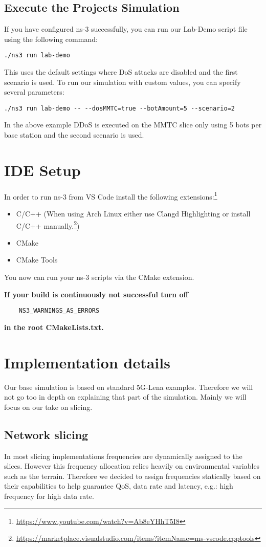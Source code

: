 \subsection{Execute the Projects Simulation}
If you have configured ns-3 successfully, you can run our Lab-Demo script file using the following command:
\begin{verbatim}
./ns3 run lab-demo
\end{verbatim}
This uses the default settings where DoS attacks are disabled and the first scenario is used. To run our simulation with custom values, you can specify several parameters:
\begin{verbatim}
./ns3 run lab-demo -- --dosMMTC=true --botAmount=5 --scenario=2
\end{verbatim}
In the above example DDoS is executed on the MMTC slice only using 5 bots per base station and the second scenario is used.

\section{IDE Setup}

In order to run ns-3 from VS Code install the following extensions:\footnote[3]{\url{https://www.youtube.com/watch?v=Ab8eYHhT5I8}}
\begin{itemize}
    \item C/C++ (When using Arch Linux either use Clangd Highlighting or install C/C++ manually.\footnote[4]{\url{https://marketplace.visualstudio.com/items?itemName=ms-vscode.cpptools}})
    \item CMake
    \item CMake Tools
\end{itemize}
You now can run your ns-3 scripts via the CMake extension.

\textbf{If your build is continuously not successful turn off} \begin{verbatim}
    NS3_WARNINGS_AS_ERRORS
\end{verbatim} \textbf{in the root CMakeLists.txt.}

\section{Implementation details}
    Our base simulation is based on standard 5G-Lena examples. Therefore we will not go too in depth on explaining that part of the simulation.
    Mainly we will focus on our take on slicing.
    
    \subsection{Network slicing}
    In most slicing implementations frequencies are dynamically assigned to the slices. However this frequency allocation relies heavily on environmental variables such as the terrain. Therefore we decided to assign frequencies statically based on their capabilities to help guarantee QoS, data rate and latency, e.g.: high frequency for high data rate.
    

